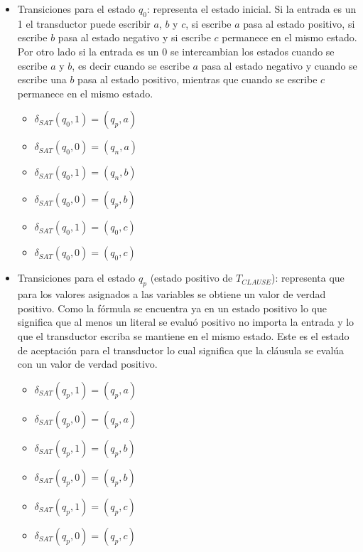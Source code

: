 \begin{itemize}
    \item Transiciones para el estado $q_0$: representa el estado inicial. Si la entrada es un 1 el
          transductor puede escribir $a$, $b$ y $c$, si escribe $a$ pasa al estado positivo, si escribe $b$
          pasa al estado negativo y si escribe $c$ permanece en el mismo estado. Por otro lado si la entrada 
          es un 0 se intercambian los estados cuando se escribe $a$ y $b$, es decir cuando se escribe $a$
          pasa al estado negativo y cuando se escribe una $b$ pasa al estado positivo, mientras que cuando 
          se escribe $c$ permanece en el mismo estado.
          
          \begin{multicols}{2}
              \begin{itemize}
                  \item $\delta_{SAT}(q_0,1)=(q_p,a)$
                  \item $\delta_{SAT}(q_0,0)=(q_n,a)$
                  \item $\delta_{SAT}(q_0,1)=(q_n,b)$
                  \item $\delta_{SAT}(q_0,0)=(q_p,b)$
                  \item $\delta_{SAT}(q_0,1)=(q_0,c)$
                  \item $\delta_{SAT}(q_0,0)=(q_0,c)$
              \end{itemize}
          \end{multicols}
          
    \item Transiciones para el estado $q_p$ (estado positivo de $T_{CLAUSE}$): representa que para los valores
          asignados a las variables se obtiene un valor de verdad positivo.  Como la fórmula se encuentra ya en un 
          estado positivo lo que significa que al menos un literal se evaluó positivo no importa la 
          entrada y lo que el transductor escriba se mantiene en el mismo estado. Este es el estado de 
          aceptación para el transductor lo cual significa que la cláusula se evalúa con un valor de verdad positivo.
          \begin{multicols}{2}
              \begin{itemize}
                  \item $\delta_{SAT}(q_{p},1)=(q_{p},a)$
                  \item $\delta_{SAT}(q_{p},0)=(q_{p},a)$
                  \item $\delta_{SAT}(q_{p},1)=(q_{p},b)$
                  \item $\delta_{SAT}(q_{p},0)=(q_{p},b)$
                  \item $\delta_{SAT}(q_{p},1)=(q_{p},c)$
                  \item $\delta_{SAT}(q_{p},0)=(q_{p},c)$
              \end{itemize}
          \end{multicols}
          

\end{itemize}
